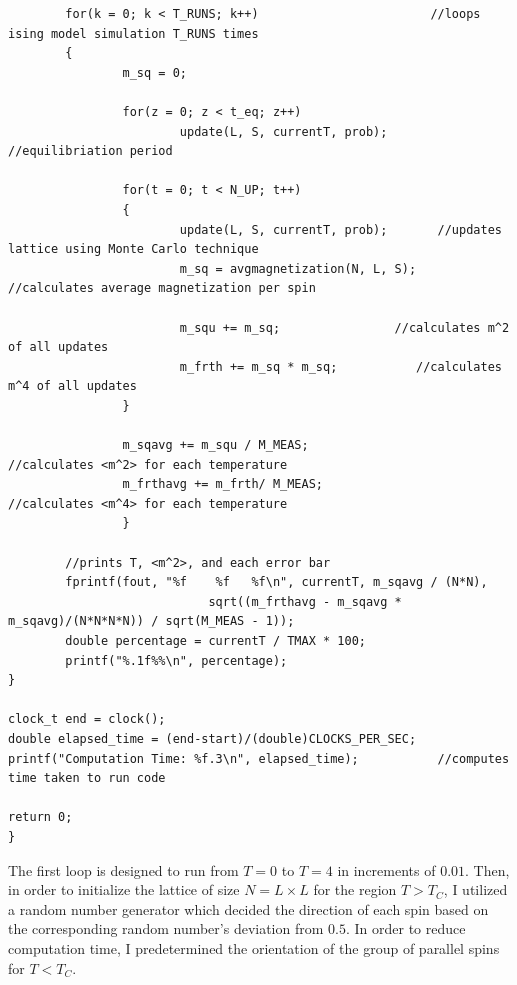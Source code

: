 \documentclass[10pt]{article}
\begin{document}
\begin{verbatim}
        for(k = 0; k < T_RUNS; k++)                        //loops ising model simulation T_RUNS times
        {
                m_sq = 0;
                
                for(z = 0; z < t_eq; z++)
                        update(L, S, currentT, prob);      //equilibriation period

                for(t = 0; t < N_UP; t++)
                {
                        update(L, S, currentT, prob);       //updates lattice using Monte Carlo technique
                        m_sq = avgmagnetization(N, L, S);   //calculates average magnetization per spin

                        m_squ += m_sq;     	          //calculates m^2 of all updates
                        m_frth += m_sq * m_sq;           //calculates m^4 of all updates
                }
                
                m_sqavg += m_squ / M_MEAS;                   //calculates <m^2> for each temperature
                m_frthavg += m_frth/ M_MEAS;               //calculates <m^4> for each temperature
                }
                
        //prints T, <m^2>, and each error bar 
        fprintf(fout, "%f    %f   %f\n", currentT, m_sqavg / (N*N),
                            sqrt((m_frthavg - m_sqavg * m_sqavg)/(N*N*N*N)) / sqrt(M_MEAS - 1));
        double percentage = currentT / TMAX * 100;
        printf("%.1f%%\n", percentage);
}

clock_t end = clock();
double elapsed_time = (end-start)/(double)CLOCKS_PER_SEC;
printf("Computation Time: %f.3\n", elapsed_time);           //computes time taken to run code

return 0;
}
\end{verbatim}

The first loop is designed to run from $T=0$ to $T=4$ in increments of $0.01$. Then, in order to initialize the lattice of size $N = L\times L$ for the region $T>T_C$, I utilized a random number generator which decided the direction of each spin based on the corresponding random number's deviation from $0.5$. In order to reduce computation time, I predetermined the orientation of the group of parallel spins for $T<T_C$.
\end{document}
